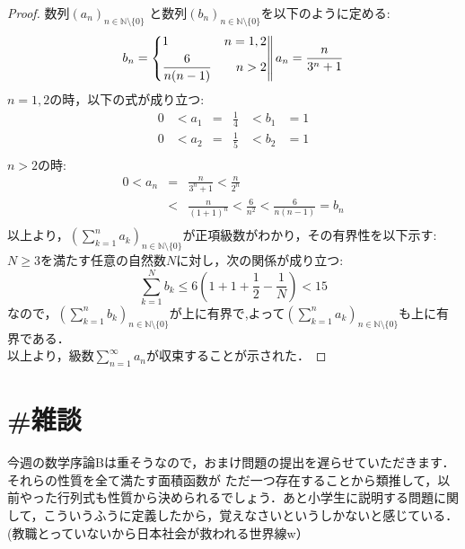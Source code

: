 \documentclass{jarticle}
\begin{document}
\begin{proof}
数列$(a_{n})_{n \in \mathbb{N}\setminus \{0\}}$ と数列$(b_{n})_{n \in \mathbb{N}\setminus \{0\}}$を以下のように定める:\\
\begin{equation}
 b_{n} = \left\{
                \begin{aligned}
                        &1 &n=1,2& \\
                        &\frac{6}{n(n-1)}& n>2&\\
                \end{aligned}
                        \right\|
        \\
        \\
        \\
        a_{n}= \frac{n}{3^n+1}
\end{equation}
$n=1,2$の時，以下の式が成り立つ:\\
\begin{equation}
	\begin{aligned}
		0 & < a_1 &=& \frac{1}{4} &<b_1&=1\\
		0 & < a_2 &=& \frac{1}{5} &<b_2&=1\\
	\end{aligned}
\end{equation}
$n>2$の時:\\
	\begin{equation}
		\begin{aligned}
			0 < a_n &=& \frac{n}{3^n+1} < \frac{n}{2^n} \\
				&<& \frac{n}{(1+1)^n}<\frac{6}{n^2}<\frac{6}{n(n-1)}=b_n\\
		\end{aligned}
	\end{equation}
以上より，$(\sum\limits_{k=1}^n a_k)_{n \in \mathbb{N} \setminus \{0\}}$が正項級数がわかり，その有界性を以下示す:
$N \ge 3$を満たす任意の自然数$N$に対し，次の関係が成り立つ:\\
$$
	\sum_{k=1}^Nb_k \le 6(1+1+ \frac{1}{2}-\frac{1}{N}) < 15
$$
なので，$(\sum\limits_{k=1}^n b_k)_{n \in \mathbb{N} \setminus \{0\}}$が上に有界で,よって$(\sum\limits_{k=1}^n a_k)_{n \in \mathbb{N} \setminus \{0\}}$も上に有界である．\\
以上より，級数$\sum\limits_{n=1}^{\infty} a_n$が収束することが示された．





\end{proof}

\section*{\#雑談}
今週の数学序論Bは重そうなので，おまけ問題の提出を遅らせていただきます．それらの性質を全て満たす面積函数が
ただ一つ存在することから類推して，以前やった行列式も性質から決められるでしょう．あと小学生に説明する問題に関して，こういうふうに定義したから，覚えなさいというしかないと感じている．(教職とっていないから日本社会が救われる世界線w）
\end{document}
